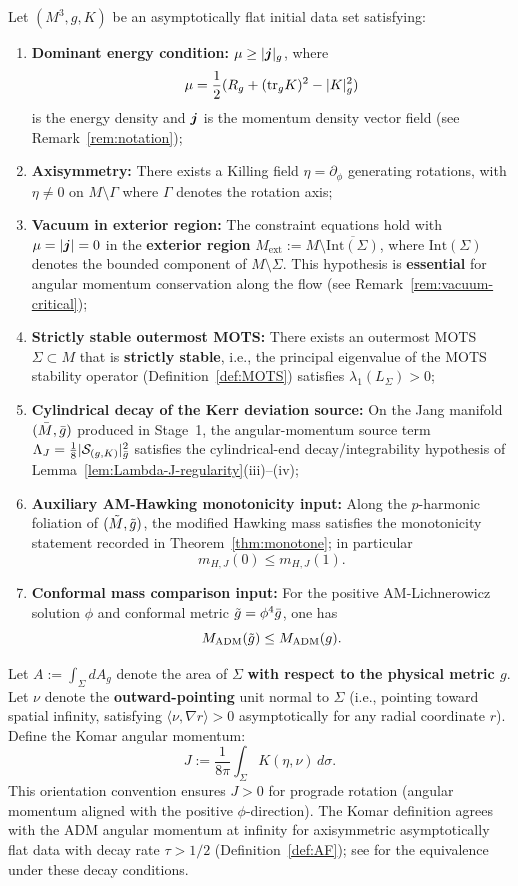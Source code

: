 \begin{theorem}\label{thm:main}
Let $(M^3, g, K)$ be an asymptotically flat initial data set satisfying:
\begin{enumerate}[label=\textup{(H\arabic*)}]
    \item \textbf{Dominant energy condition:} $\mu \geq |\boldsymbol{j}|_g$, where 
    \[
    \mu = \frac{1}{2}(R_g + (\mathrm{tr}_g K)^2 - |K|_g^2)
    \]
    is the energy density and $\boldsymbol{j}$ is the momentum density vector field (see Remark~\ref{rem:notation});
    \item \textbf{Axisymmetry:} There exists a Killing field $\eta = \partial_\phi$ generating rotations, with $\eta \neq 0$ on $M \setminus \Gamma$ where $\Gamma$ denotes the rotation axis;\footnotemark[1]
    \item \textbf{Vacuum in exterior region:} The constraint equations hold with $\mu = |\boldsymbol{j}| = 0$ in the \textbf{exterior region} $M_{\mathrm{ext}} := M \setminus \overline{\mathrm{Int}(\Sigma)}$, where $\mathrm{Int}(\Sigma)$ denotes the bounded component of $M \setminus \Sigma$. This hypothesis is \textbf{essential} for angular momentum conservation along the flow (see Remark~\ref{rem:vacuum-critical});
    \item \textbf{Strictly stable outermost MOTS:} There exists an outermost MOTS $\Sigma \subset M$ that is \textbf{strictly stable}, i.e., the principal eigenvalue of the MOTS stability operator (Definition~\ref{def:MOTS}) satisfies $\lambda_1(L_\Sigma) > 0$;
    \item \textbf{Cylindrical decay of the Kerr deviation source:} On the Jang manifold $(\bar{M},\bar{g})$ produced in Stage~1, the angular-momentum source term $\Lambda_J = \frac18 |\mathcal{S}_{(g,K)}|_{\bar{g}}^2$ satisfies the cylindrical-end decay/integrability hypothesis of Lemma~\ref{lem:Lambda-J-regularity}(iii)--(iv);
    \item \textbf{Auxiliary AM-Hawking monotonicity input:} Along the $p$-harmonic foliation of $(\tilde{M},\tilde{g})$, the modified Hawking mass satisfies the monotonicity statement recorded in Theorem~\ref{thm:monotone}; in particular
    \[
    m_{H,J}(0)\le m_{H,J}(1).
    \]
    \item \textbf{Conformal mass comparison input:} For the positive AM-Lichnerowicz solution $\phi$ and conformal metric $\tilde{g}=\phi^4\bar{g}$, one has
    \[
    M_{\mathrm{ADM}}(\tilde{g}) \leq M_{\mathrm{ADM}}(g).
    \]
\end{enumerate}
Let $A := \int_\Sigma dA_g$ denote the area of $\Sigma$ \textbf{with respect to the physical metric $g$}. Let $\nu$ denote the \textbf{outward-pointing} unit normal to $\Sigma$ (i.e., pointing toward spatial infinity, satisfying $\langle \nu, \nabla r \rangle > 0$ asymptotically for any radial coordinate $r$). Define the Komar angular momentum:
\[
J := \frac{1}{8\pi} \int_\Sigma K(\eta, \nu) \, d\sigma.
\]
This orientation convention ensures $J > 0$ for prograde rotation (angular momentum aligned with the positive $\phi$-direction). The Komar definition agrees with the ADM angular momentum at infinity for axisymmetric asymptotically flat data with decay rate $\tau > 1/2$ (Definition~\ref{def:AF}); see \cite{chrusciel2008, mars2009} for the equivalence under these decay conditions.


\end{theorem}
